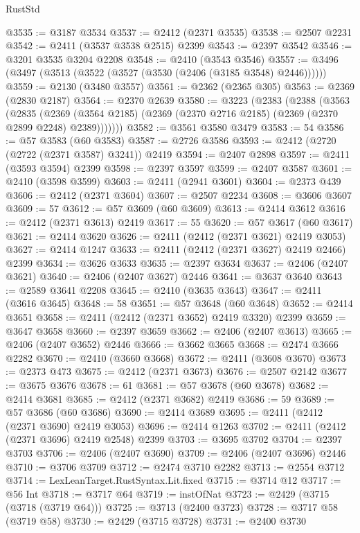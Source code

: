 \begin{lexlean}{RustStd}
\begin{coremodule}
@3535 := @3187 @3534
@3537 := @2412 (@2371 @3535)
@3538 := @2507 @2231
@3542 := @2411 (@3537 @3538 @2515) @2399
@3543 := @2397 @3542
@3546 := @3201 @3535 @3204 @2208
@3548 := @2410 (@3543 @3546)
@3557 := @3496 (@3497 (@3513 (@3522 (@3527 (@3530 (@2406 (@3185 @3548) @2446))))))
@3559 := @2130 (@3480 @3557)
@3561 := @2362 (@2365 @305)
@3563 := @2369 (@2830 @2187)
@3564 := @2370 @2639
@3580 := @3223
    (@2383
      (@2388
        (@3563
          (@2835
            (@2369 (@3564 @2185) (@2369 (@2370 @2716 @2185) (@2369 (@2370 @2899 @2248) @2389)))))))
@3582 := @3561 @3580 @3479
@3583 := 54
@3586 := @57 @3583 (@60 @3583)
@3587 := @2726 @3586
@3593 := @2412 (@2720 (@2722 (@2371 @3587) @3241)) @2419
@3594 := @2407 @2898
@3597 := @2411 (@3593 @3594) @2399
@3598 := @2397 @3597
@3599 := @2407 @3587
@3601 := @2410 (@3598 @3599)
@3603 := @2411 (@2941 @3601)
@3604 := @2373 @439
@3606 := @2412 (@2371 @3604)
@3607 := @2507 @2234
@3608 := @3606 @3607
@3609 := 57
@3612 := @57 @3609 (@60 @3609)
@3613 := @2414 @3612
@3616 := @2412 (@2371 @3613) @2419
@3617 := 55
@3620 := @57 @3617 (@60 @3617)
@3621 := @2414 @3620
@3626 := @2411 (@2412 (@2371 @3621) @2419 @3053)
@3627 := @2414 @1247
@3633 := @2411 (@2412 (@2371 @3627) @2419 @2466) @2399
@3634 := @3626 @3633
@3635 := @2397 @3634
@3637 := @2406 (@2407 @3621)
@3640 := @2406 (@2407 @3627) @2446
@3641 := @3637 @3640
@3643 := @2589 @3641 @2208
@3645 := @2410 (@3635 @3643)
@3647 := @2411 (@3616 @3645)
@3648 := 58
@3651 := @57 @3648 (@60 @3648)
@3652 := @2414 @3651
@3658 := @2411 (@2412 (@2371 @3652) @2419 @3320) @2399
@3659 := @3647 @3658
@3660 := @2397 @3659
@3662 := @2406 (@2407 @3613)
@3665 := @2406 (@2407 @3652) @2446
@3666 := @3662 @3665
@3668 := @2474 @3666 @2282
@3670 := @2410 (@3660 @3668)
@3672 := @2411 (@3608 @3670)
@3673 := @2373 @473
@3675 := @2412 (@2371 @3673)
@3676 := @2507 @2142
@3677 := @3675 @3676
@3678 := 61
@3681 := @57 @3678 (@60 @3678)
@3682 := @2414 @3681
@3685 := @2412 (@2371 @3682) @2419
@3686 := 59
@3689 := @57 @3686 (@60 @3686)
@3690 := @2414 @3689
@3695 := @2411 (@2412 (@2371 @3690) @2419 @3053)
@3696 := @2414 @1263
@3702 := @2411 (@2412 (@2371 @3696) @2419 @2548) @2399
@3703 := @3695 @3702
@3704 := @2397 @3703
@3706 := @2406 (@2407 @3690)
@3709 := @2406 (@2407 @3696) @2446
@3710 := @3706 @3709
@3712 := @2474 @3710 @2282
@3713 := @2554 @3712
@3714 := LexLeanTarget.RustSyntax.Lit.fixed
@3715 := @3714 @12
@3717 := @56 Int
@3718 := @3717 @64
@3719 := instOfNat
@3723 := @2429 (@3715 (@3718 (@3719 @64)))
@3725 := @3713 (@2400 @3723)
@3728 := @3717 @58 (@3719 @58)
@3730 := @2429 (@3715 @3728)
@3731 := @2400 @3730

\end{coremodule}
\end{lexlean}
